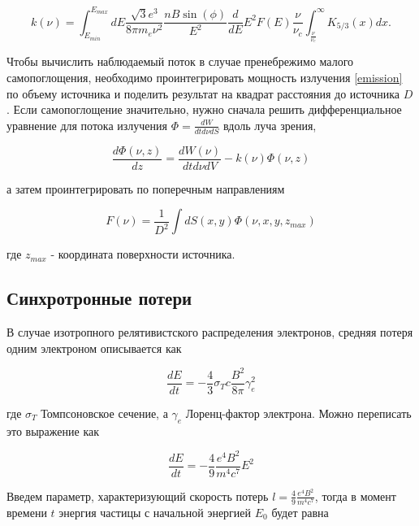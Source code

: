 \begin{equation}\label{absorption}
	k(\nu)=\int_{E_{min}}^{E_{max}}dE\frac {\sqrt {3}{e}^{3}}{8\pi m_e \nu^2}\frac{n B\sin(\phi)}{E^2}
	\frac{d}{dE} E^2 F(E)\frac {\nu}{ \nu_c}\int_{\frac {\nu}{ \nu_c}}^{\infty }K_{5/3}(x) dx.
\end{equation}

Чтобы вычислить наблюдаемый поток в случае пренебрежимо малого самопоглощения, необходимо проинтегрировать мощность излучения  \ref{emission} по объему источника и поделить результат на квадрат расстояния до источника  $D$. Если самопоглощение значительно, нужно сначала решить дифференциальное уравнение для потока излучения $\Phi=\frac{dW}{dt d\nu dS}$ вдоль луча зрения,

\begin{equation}
	\frac{d\Phi(\nu,z)}{dz} = \frac{dW(\nu)}{dt d\nu dV} - k(\nu)\Phi(\nu,z)
\end{equation}

а затем проинтегрировать по поперечным направлениям

\begin{equation}
	F(\nu)=\frac{1}{D^2}\int dS(x,y) \Phi(\nu, x,y,z_{max})
\end{equation}

где $z_{max}$ - координата поверхности источника.

\subsection*{Синхротронные потери}

В случае изотропного релятивистского распределения электронов, средняя потеря одним электроном описывается как

\begin{equation}
	\frac{dE}{dt} = -\frac{4}{3} \sigma_T c \frac{B^2}{8 \pi} \gamma_e^2
\end{equation}

где $\sigma_T$ Томпсоновское сечение, а $\gamma_e$ Лоренц-фактор электрона. Можно переписать это выражение как

\begin{equation} \label{synchlosses}
	\frac{dE}{dt} = - \frac{4}{9} \frac{e^4 B^2}{m^4 c^7} E^2
\end{equation}

Введем параметр, характеризующий скорость потерь $l = \frac{4}{9} \frac{e^4 B^2}{m^4 c^7}$, тогда в момент времени $t$ энергия частицы с начальной энергией $E_0$ будет равна

